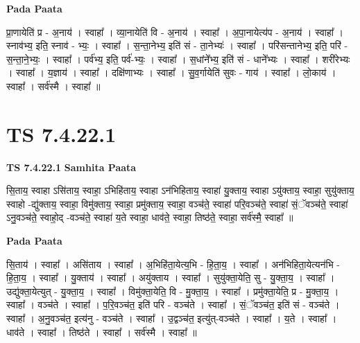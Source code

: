 \documentclass[17pt]{extarticle}
\begin{document}
\textbf{Pada Paata} \newline

प्रा॒णायेति॑ प्र - अ॒नाय॑ । स्वाहा᳚ । व्या॒नायेति॑ वि - अ॒नाय॑ । स्वाहा᳚ । अ॒पा॒नायेत्य॑प - अ॒नाय॑ । स्वाहा᳚ । स्नाव॑भ्य॒ इति॒ स्नाव॑ - भ्यः॒ । स्वाहा᳚ । स॒न्ता॒नेभ्य॒ इति॑ सं - ता॒नेभ्यः॑ । स्वाहा᳚ । परि॑सन्तानेभ्य॒ इति॒ परि॑ - स॒न्ता॒ने॒भ्यः॒ । स्वाहा᳚ । पर्व॑भ्य॒ इति॒ पर्व॑-भ्यः॒ । स्वाहा᳚ । स॒धांने᳚भ्य॒ इति॑ सं - धाने᳚भ्यः । स्वाहा᳚ । शरी॑रेभ्यः । स्वाहा᳚ । य॒ज्ञाय॑ । स्वाहा᳚ । दक्षि॑णाभ्यः । स्वाहा᳚ । सु॒व॒र्गायेति॑ सुवः - गाय॑ । स्वाहा᳚ । लो॒काय॑ । स्वाहा᳚ । सर्व॑स्मै । स्वाहा᳚ ॥  \newline





\section{ TS 7.4.22.1 }

\textbf{TS 7.4.22.1 } \newline
\textbf{Samhita Paata} \newline

सि॒ताय॒ स्वाहा ऽसि॑ताय॒ स्वाहा॒ ऽभिहि॑ताय॒ स्वाहा ऽन॑भिहिताय॒ स्वाहा॑ यु॒क्ताय॒ स्वाहा ऽयु॑क्ताय॒ स्वाहा॒ सुयु॑क्ताय॒ स्वाहो -द्यु॑क्ताय॒ स्वाहा॒ विमु॑क्ताय॒ स्वाहा॒ प्रमु॑क्ताय॒ स्वाहा॒ वञ्च॑ते॒ स्वाहा॑ परि॒वञ्च॑ते॒ स्वाहा॑ सं॒ॅवञ्च॑ते॒ स्वाहा॑ ऽनु॒वञ्च॑ते॒ स्वाहो॒द् -वञ्च॑ते॒ स्वाहा॑ य॒ते स्वाहा॒ धाव॑ते॒ स्वाहा॒ तिष्ठ॑ते॒ स्वाहा॒ सर्व॑स्मै॒ स्वाहा᳚ ॥ \newline

\textbf{Pada Paata} \newline

सि॒ताय॑ । स्वाहा᳚ । असि॑ताय । स्वाहा᳚ । अ॒भिहि॑ता॒येत्य॒भि - हि॒ता॒य॒ । स्वाहा᳚ । अन॑भिहिता॒येत्यन॑भि - हि॒ता॒य॒ । स्वाहा᳚ । यु॒क्ताय॑ । स्वाहा᳚ । अयु॑क्ताय । स्वाहा᳚ । सुयु॑क्ता॒येति॒ सु - यु॒क्ता॒य॒ । स्वाहा᳚ । उद्यु॑क्ता॒येत्युत् - यु॒क्ता॒य॒ । स्वाहा᳚ । विमु॑क्ता॒येति॒ वि - मु॒क्ता॒य॒ । स्वाहा᳚ । प्रमु॑क्ता॒येति॒ प्र - मु॒क्ता॒य॒ । स्वाहा᳚ । वञ्च॑ते । स्वाहा᳚ । प॒रि॒वञ्च॑त॒ इति॑ परि - वञ्च॑ते । स्वाहा᳚ । सं॒ॅवञ्च॑त॒ इति॑ सं - वञ्च॑ते । स्वाहा᳚ । अ॒नु॒वञ्च॑त॒ इत्य॑नु - वञ्च॑ते । स्वाहा᳚ । उ॒द्वञ्च॑त॒ इत्यु॑त्-वञ्च॑ते । स्वाहा᳚ । य॒ते । स्वाहा᳚ । धाव॑ते । स्वाहा᳚ । तिष्ठ॑ते । स्वाहा᳚ । सर्व॑स्मै । स्वाहा᳚ ॥  \newline
\end{document}
